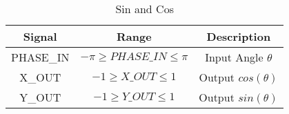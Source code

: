 \begin{table}[!htbp]
  \centering
  \caption{Sin and Cos}
    \begin{tabular}{|c|c|c|}
    \toprule
    Signal & Range & Description \\
    \midrule
    PHASE\_IN & $-\pi  \geq PHASE\_IN \leq \pi $ & Input Angle $\theta $ \\
	\hline
    X\_OUT & $ -1 \geq X\_OUT \leq 1 $ & Output $cos(\theta )$ \\
	\hline
    Y\_OUT & $ -1 \geq Y\_OUT \leq 1 $ & Output $sin(\theta )$ \\
    \bottomrule
    \end{tabular}%
  \label{tab:CORDICinputRange}%
\end{table}%
